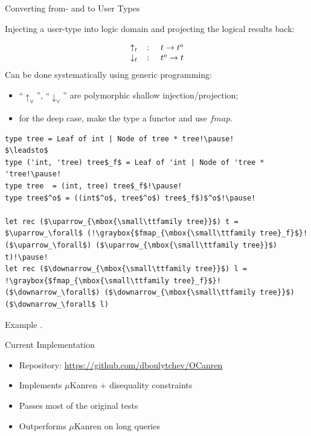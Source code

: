 \documentclass[10pt, mathserif]{beamer}
\let\\\tabularnewline
\let\\\tabularnewline
\newcommand{\oo}[1]{{#1}^o}
\newcommand{\graybox}[1]{\colorbox{light-gray}{#1}}
\theoremstyle{definition}
\begin{document}
\begin{frame}[fragile]{Converting from- and to User Types}

\small
Injecting a user-type into logic domain and projecting the
logical results back:

$$
\begin{array}{rcl}
\uparrow_t&\colon &t \to \oo{t}\\
\downarrow_t&\colon& \oo{t} \to t
\end{array}
$$
\pause
Can be done systematically using generic programming:

\begin{itemize}
\item ``$\uparrow_\forall$'', ``$\downarrow_\forall$'' are polymorphic shallow injection/projection;
\item for the deep case, make the type a functor and use $fmap$.
\end{itemize}
\pause
\begin{lstlisting}[mathescape=true]
type tree = Leaf of int | Node of tree * tree!\pause!
$\leadsto$
type ('int, 'tree) tree$_f$ = Leaf of 'int | Node of 'tree * 'tree!\pause!
type tree  = (int, tree) tree$_f$!\pause!
type tree$^o$ = ((int$^o$, tree$^o$) tree$_f$)$^o$!\pause!

let rec ($\uparrow_{\mbox{\small\ttfamily tree}}$) t = $\uparrow_\forall$ (!\graybox{$fmap_{\mbox{\small\ttfamily tree}_f}$}! ($\uparrow_\forall$) ($\uparrow_{\mbox{\small\ttfamily tree}}$) t)!\pause! 
let rec ($\downarrow_{\mbox{\small\ttfamily tree}}$) l = !\graybox{$fmap_{\mbox{\small\ttfamily tree}_f}$}! ($\downarrow_\forall$) ($\downarrow_{\mbox{\small\ttfamily tree}}$) ($\downarrow_\forall$ l) 

\end{lstlisting}
\end{frame}

\begin{frame}[fragile]{Example}
.
\end{frame}

\begin{frame}[fragile]{Current Implementation}
\begin{itemize}
\item Repository: \url{https://github.com/dboulytchev/OCanren}
\item Implements $\mu$Kanren + disequality constraints
\item Passes most of the original tests
\item Outperforms $\mu$Kanren on long queries
\end{itemize}

\end{frame}
\end{document}
